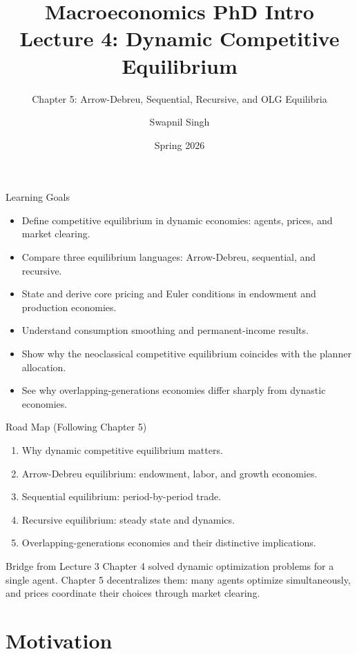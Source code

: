 \documentclass[aspectratio=169,10pt]{beamer}
\title{Macroeconomics PhD Intro\\Lecture 4: Dynamic Competitive Equilibrium}
\subtitle{Chapter 5: Arrow-Debreu, Sequential, Recursive, and OLG Equilibria}
\author{Swapnil Singh}
\institute{Lietuvos Bankas \and Kaunas University of Technology}
\date{Spring 2026}
\begin{document}
\begin{frame}
  \titlepage
\end{frame}

\begin{frame}{Learning Goals}
\begin{itemize}
  \item Define competitive equilibrium in dynamic economies: agents, prices, and market clearing.
  \item Compare three equilibrium languages: Arrow-Debreu, sequential, and recursive.
  \item State and derive core pricing and Euler conditions in endowment and production economies.
  \item Understand consumption smoothing and permanent-income results.
  \item Show why the neoclassical competitive equilibrium coincides with the planner allocation.
  \item See why overlapping-generations economies differ sharply from dynastic economies.
\end{itemize}
\end{frame}

\begin{frame}{Road Map (Following Chapter 5)}
\begin{enumerate}
  \item Why dynamic competitive equilibrium matters.
  \item Arrow-Debreu equilibrium: endowment, labor, and growth economies.
  \item Sequential equilibrium: period-by-period trade.
  \item Recursive equilibrium: steady state and dynamics.
  \item Overlapping-generations economies and their distinctive implications.
\end{enumerate}

\begin{block}{Bridge from Lecture 3}
Chapter 4 solved dynamic optimization problems for a single agent. Chapter 5 decentralizes them: many agents optimize simultaneously, and prices coordinate their choices through market clearing.
\end{block}
\end{frame}

\section{Motivation}
\end{document}
